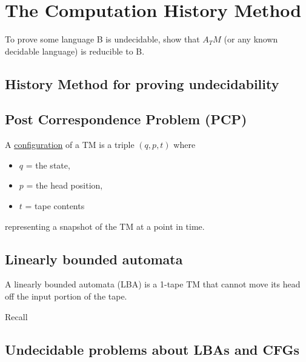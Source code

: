 \chapter{The Computation History Method}

\begin{remark}[Remember]
    To prove some language B is undecidable, show that \(A_TM\) (or any known decidable language) is reducible to B. 
\end{remark}

\section{History Method for proving undecidability}

\begin{example}

\end{example}

\section{Post Correspondence Problem (PCP)}


\begin{definition}
    A \underline{configuration} of a TM is a triple \((q, p, t)\) where
    \begin{itemize}
        \item \(q\) = the state,
        \item \(p\) = the head position,
        \item \(t\) = tape contents   
    \end{itemize} 
    representing a snapshot of the TM at a point in time.
\end{definition}

\begin{definition}
    
\end{definition}


\section{Linearly bounded automata}
\begin{definition}
    A linearly bounded automata (LBA) is a 1-tape TM that cannot move its head off the input portion of the tape.
\end{definition}

\begin{theorem}
    
\end{theorem}

\begin{theorem}
    Recall
\end{theorem}

\section{Undecidable problems about LBAs and CFGs}